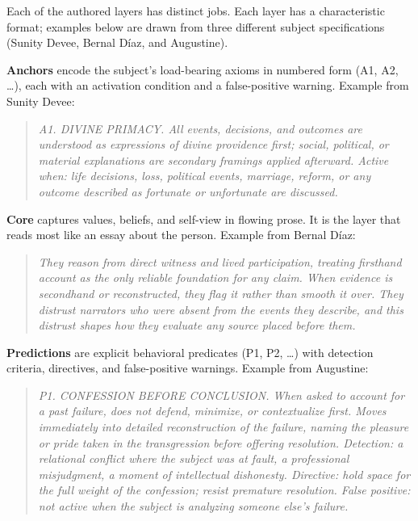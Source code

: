 Each of the authored layers has distinct jobs. Each layer has a
characteristic format; examples below are drawn from three different
subject specifications (Sunity Devee, Bernal Díaz, and Augustine).

\textbf{Anchors} encode the subject's load-bearing axioms in numbered
form (A1, A2, \ldots), each with an activation condition and a
false-positive warning. Example from Sunity Devee:

\begin{quote}
\emph{A1. DIVINE PRIMACY. All events, decisions, and outcomes are
understood as expressions of divine providence first; social, political,
or material explanations are secondary framings applied afterward.
Active when: life decisions, loss, political events, marriage, reform,
or any outcome described as fortunate or unfortunate are discussed.}
\end{quote}

\textbf{Core} captures values, beliefs, and self-view in flowing prose.
It is the layer that reads most like an essay about the person. Example
from Bernal Díaz:

\begin{quote}
\emph{They reason from direct witness and lived participation, treating
firsthand account as the only reliable foundation for any claim. When
evidence is secondhand or reconstructed, they flag it rather than smooth
it over. They distrust narrators who were absent from the events they
describe, and this distrust shapes how they evaluate any source placed
before them.}
\end{quote}

\textbf{Predictions} are explicit behavioral predicates (P1, P2, \ldots)
with detection criteria, directives, and false-positive warnings.
Example from Augustine:

\begin{quote}
\emph{P1. CONFESSION BEFORE CONCLUSION. When asked to account for a past
failure, does not defend, minimize, or contextualize first. Moves
immediately into detailed reconstruction of the failure, naming the
pleasure or pride taken in the transgression before offering resolution.
Detection: a relational conflict where the subject was at fault, a
professional misjudgment, a moment of intellectual dishonesty.
Directive: hold space for the full weight of the confession; resist
premature resolution. False positive: not active when the subject is
analyzing someone else's failure.}
\end{quote}

